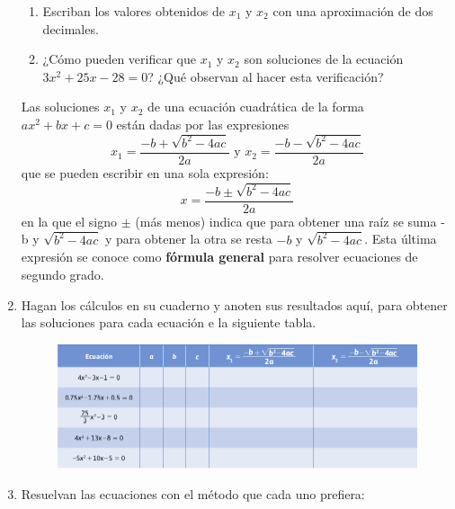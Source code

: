 \documentclass[11pt]{book}
\begin{document}
\begin{enumerate}
\begin{enumerate}
              \item  Escriban los valores obtenidos de $x_1$ y $x_2$ con una aproximación de dos decimales.
              \item ¿Cómo pueden verificar que $x_1$ y $x_2$ son soluciones de la ecuación $3x^2 + 25x - 28 = 0$? ¿Qué observan al hacer esta verificación?
          \end{enumerate}

          \begin{boxH}
              Las soluciones $x_1$ y $x_2$ de una ecuación cuadrática de la forma $ax^2 + bx + c = 0$ están dadas por las expresiones
              \[ x_1= \dfrac{-b+\sqrt{b^2-4ac}}{2a} \text{ y }  x_2= \dfrac{-b-\sqrt{b^2-4ac}}{2a}\]
              que se pueden escribir en una sola expresión:
              \[x= \dfrac{-b\pm\sqrt{b^2-4ac}}{2a}\]
              en la que el signo $\pm$ (más menos) indica que para obtener una raíz se suma - b y
              $\sqrt{b^2 - 4ac}$ y para obtener la otra se resta $- b$ y $\sqrt{b^2 - 4ac}$. Esta última expresión se
              conoce como \textbf{fórmula general} para resolver ecuaciones de segundo grado.
          \end{boxH}

          \newpage

    \item Hagan los cálculos en su cuaderno y anoten sus resultados aquí, para obtener las soluciones para cada ecuación e la siguiente tabla.

          \begin{figure}[H]
              \centering
              \includegraphics[width=\textwidth]{table2.10.png}
              \label{tab:table2.10}
          \end{figure}

    \item Resuelvan las ecuaciones con el método que cada uno prefiera:


\end{enumerate}
\end{document}

